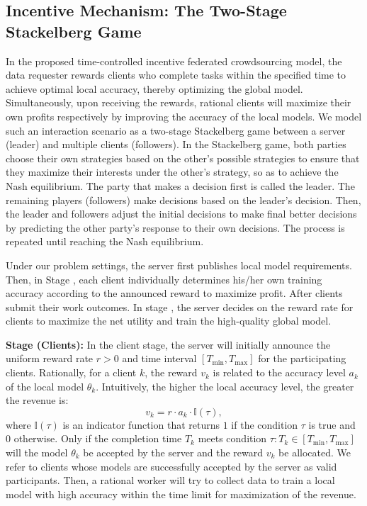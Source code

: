 \documentclass[final,1p,times]{elsarticle}
\begin{document}
\subsection{Incentive Mechanism: The Two-Stage Stackelberg Game}
In the proposed time-controlled incentive federated crowdsourcing model, the data requester rewards clients who complete tasks within the specified time to achieve optimal local accuracy, thereby optimizing the global model. Simultaneously, upon receiving the rewards, rational clients will maximize their own profits respectively by improving the accuracy of the local models. We model such an interaction scenario as a two-stage Stackelberg game between a server (leader) and multiple clients (followers). In the Stackelberg game, both parties choose their own strategies based on the other's possible strategies to ensure that they maximize their interests under the other's strategy, so as to achieve the Nash equilibrium. The party that makes a decision first is called the leader. The remaining players (followers) make decisions based on the leader's decision. Then, the leader and followers adjust the initial decisions to make final better decisions by predicting the other party's response to their own decisions. The process is repeated until reaching the Nash equilibrium. 

Under our problem settings, the server first publishes local model requirements. Then, in Stage \uppercase\expandafter{}, each client individually determines his/her own training accuracy according to the announced reward to maximize profit. After clients submit their work outcomes. In stage \uppercase\expandafter{}, the server decides on the reward rate for clients to maximize the net utility and train the high-quality global model.

\textbf{Stage \uppercase\expandafter{} (Clients):} In the client stage, the server will initially announce the uniform reward rate $r>0$ and time interval $[T_{\min},T_{\max}]$ for the participating clients. Rationally, for a client $k$, the reward $v_k$ is related to the accuracy level $a_k$ of the local model $\theta_k$. Intuitively, the higher the local accuracy level, the greater the revenue is:
\begin{equation}\label{eq:reward}
	v_k = r\cdot a_k\cdot \mathbb{I}(\tau),
\end{equation}
where $\mathbb{I}(\tau)$ is an indicator function that returns $1$ if the condition $\tau$ is true and $0$ otherwise. Only if the completion time $T_k$ meets condition $\tau: T_k\in[T_{\min},T_{\max}]$ will the model $\theta_k$ be accepted by the server and the reward $v_k$ be allocated. We refer to clients whose models are successfully accepted by the server as valid participants. Then, a rational worker will try to collect data to train a local model with high accuracy within the time limit for maximization of the revenue.  
\end{document}
